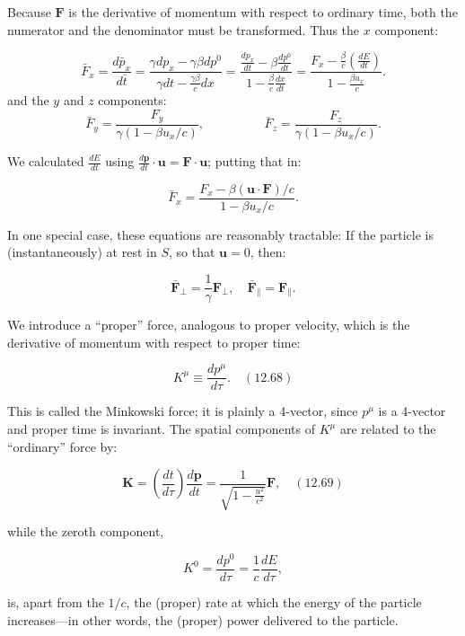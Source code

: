 \documentclass[12pt]{book}
\begin{document}
        Because \(\bm{F}\) is the derivative of momentum with respect to ordinary time, both the numerator and the denominator must be transformed. Thus the \(x\) component:
        
        \[
        \bar{F}_x = \frac{d \bar{p}_x}{d \bar{t}} = \frac{\gamma dp_x - \gamma\beta dp^0}{\gamma dt -  \frac{\gamma\beta}{c} dx} = \frac{\frac{dp_x}{dt} - \beta \frac{ dp^0}{dt}}{1 - \frac{\beta}{c}\frac{dx}{dt}} = \frac{F_x - \frac{\beta}{c}(\frac{dE}{dt})}{1 - \frac{\beta u_x}{c}}.
        \]
        and the \(y\) and \(z\) components:
        \[
        \bar{F}_y = \frac{F_y}{\gamma (1 - \beta u_x/c)}, \hspace{2cm} \bar{F}_z = \frac{F_z}{\gamma (1 - \beta u_x/c)}. 
        \]      
        
        We calculated \(\frac{dE}{dt}\) using \(\frac{d\bm{p}}{dt} \cdot \bm{u} = \bm{F} \cdot \bm{u}\); putting that in:
        
        \[
        \bar{F}_x = \frac{F_x - \beta (\bm{u} \cdot \bm{F})/c}{1 - \beta u_x/c}.
        \]
        
        In one special case, these equations are reasonably tractable: If the particle is (instantaneously) at rest in \(S\), so that \(\bm{u} = 0\), then:
        
        \[
        \bar{\bm{F}}_\perp = \frac{1}{\gamma} \bm{F}_\perp, \quad \bar{\bm{F}}_\parallel = \bm{F}_\parallel.
        \]
        
        We introduce a “proper” force, analogous to proper velocity, which is the derivative of momentum with respect to proper time:
        
        \[
        K^\mu \equiv \frac{dp^\mu}{d\tau}. \quad (12.68)
        \]
        
        This is called the Minkowski force; it is plainly a 4-vector, since \(p^\mu\) is a 4-vector and proper time is invariant. The spatial components of \(K^\mu\) are related to the “ordinary” force by:
        
        \[
        \bm{K} = \left(\frac{dt}{d\tau}\right) \frac{d\bm{p}}{dt} = \frac{1}{\sqrt{1 - \frac{u^2}{c^2}}} \bm{F}, \quad (12.69)
        \]
        
        while the zeroth component,
        
        \[
        K^0 = \frac{dp^0}{d\tau} = \frac{1}{c} \frac{dE}{d\tau},
        \]
        
        is, apart from the \(1/c\), the (proper) rate at which the energy of the particle increases—in other words, the (proper) power delivered to the particle.
\end{document}
